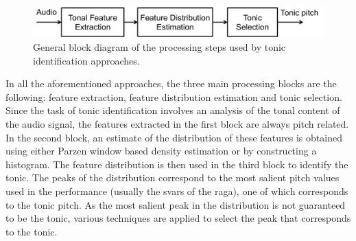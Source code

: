 \begin{figure}
	\begin{center}
		\includegraphics[width=\figSizeNinety]{ch05_preprocessing/figures/tonic_identification_block_diagram.pdf}
	\end{center}
	\caption[General block diagram of the processing steps used by tonic identification
	approaches.]{General block diagram of the processing steps used by tonic identification
		approaches.}
	\label{fig:tonic_identification_general_block_diagram}
\end{figure}


In all the aforementioned approaches, the three main processing blocks are the following: feature
extraction, feature distribution estimation and tonic selection. Since the task
of tonic identification involves an analysis of the tonal content of the audio
signal, the features extracted in the first block are always pitch related. In
the second block, an estimate of the distribution of these features is obtained
using either Parzen window based density estimation or by constructing a
histogram. The feature distribution is then used in the third block to identify
the tonic. The peaks of the distribution correspond to the most salient pitch
values used in the performance (usually the svars of the \gls{raga}), one of which
corresponds to the tonic pitch. As the most salient peak in the distribution is
not guaranteed to be the tonic, various techniques are applied to select the peak that corresponds to the tonic.



